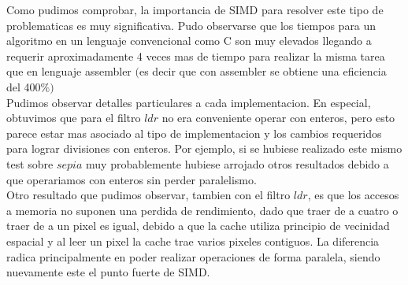 Como pudimos comprobar, la importancia de SIMD para resolver este tipo de problematicas es muy significativa. 
Pudo observarse que los tiempos para un algoritmo en un lenguaje convencional como C son muy elevados llegando a requerir aproximadamente 4 veces mas de tiempo para realizar la misma tarea que en lenguaje assembler $($es decir que con assembler se obtiene una eficiencia del 400$ \% )$\\

Pudimos observar detalles particulares a cada implementacion. En especial, obtuvimos que para el filtro $ldr$ no era conveniente operar con enteros, pero esto parece estar mas asociado al tipo de implementacion y los cambios requeridos para lograr divisiones con enteros. Por ejemplo, si se hubiese realizado este mismo test sobre $sepia$ muy probablemente hubiese arrojado otros resultados debido a que operariamos con enteros sin perder paralelismo.\\

Otro resultado que pudimos observar, tambien con el filtro $ldr$, es que los accesos a memoria no suponen una perdida de rendimiento, dado que traer de a cuatro o traer de a un pixel es igual, debido a que la cache utiliza principio de vecinidad espacial y al leer un pixel la cache trae varios pixeles contiguos. La diferencia radica principalmente en poder realizar operaciones de forma paralela, siendo nuevamente este el punto fuerte de SIMD. \\


